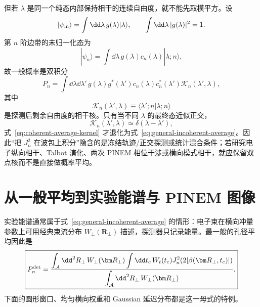 但若 $\lambda$ 是同一个纯态内部保持相干的连续自由度，就不能先取模平方。设
\begin{equation}
 |\psi_{\rm in}\rangle
 =\int\dd\lambda\,g(\lambda)|\lambda\rangle,
 \qquad
 \int\dd\lambda\,|g(\lambda)|^2=1.
\end{equation}
第 $n$ 阶边带的未归一化态为
\begin{equation}
 |\psi_n\rangle
 =\int\dd\lambda\,g(\lambda)c_n(\lambda)
 |\lambda;n\rangle,
\end{equation}
故一般概率是双积分
\begin{equation}
 \boxed{
 P_n
 =\int\dd\lambda\dd\lambda'\,
 g(\lambda)g^*(\lambda')
 c_n(\lambda)c_n^*(\lambda')
 \mathcal K_n(\lambda',\lambda),}
 \label{eq:coherent-average-kernel}
\end{equation}
其中
\begin{equation}
 \mathcal K_n(\lambda',\lambda)
 \equiv\langle\lambda';n|\lambda;n\rangle
\end{equation}
是探测后剩余自由度的相干核。只有当不同 $\lambda$ 的最终态近似正交，
\begin{equation}
 \mathcal K_n(\lambda',\lambda)
 \simeq\delta(\lambda-\lambda'),
 \label{eq:diagonal-detection-limit}
\end{equation}
式~\eqref{eq:coherent-average-kernel} 才退化为式~\eqref{eq:general-incoherent-average}。因此“把 $J_n^2$ 在波包上积分”隐含的是冻结轨迹/正交探测或统计混合条件；若研究电子纵向相干、Talbot 演化、两次 PINEM 相位干涉或横向模式相干，就应保留双点核而不是直接做概率平均。

\section{从一般平均到实验能谱与 PINEM 图像}

实验能谱通常属于式~\eqref{eq:general-incoherent-average} 的情形：电子束在横向冲量参数上可用经典束流分布 $W_\perp(\bm R_\perp)$ 描述，探测器只记录能量。最一般的孔径平均因此是
\begin{equation}
 \boxed{
 P_n^{\rm det}
 =\frac{\displaystyle
 \int_{\mathcal A}\dd^2R_\perp\,
 W_\perp(\bm R_\perp)
 \int\dd t_c\,W_t(t_c)
 J_n^2\!\left(2|\beta(\bm R_\perp,t_c)|\right)}
 {\displaystyle
 \int_{\mathcal A}\dd^2R_\perp\,W_\perp(\bm R_\perp)}.}
 \label{eq:general-detector-average}
\end{equation}
下面的圆形窗口、均匀横向权重和 Gaussian 延迟分布都是这一母式的特例。

